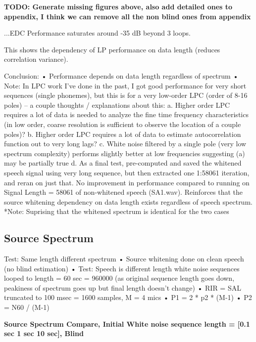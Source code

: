 \textbf{TODO: Generate missing figures above, also add detailed ones to appendix, I think we can remove all the non blind ones from appendix}


...EDC Performance saturates around -35 dB beyond 3 loops.


This shows the dependency of LP performance on data length (reduces correlation variance).

Conclusion:
•	Performance depends on data length regardless of spectrum
•	Note: In LPC work I’ve done in the past, I got good performance for very short sequences (single phonemes), but this is for a very low-order LPC (order of 8-16 poles) --  a couple thoughts / explanations about this:
a.	Higher order LPC requires a lot of data is needed to analyze the fine time frequency characteristics (in low order, coarse resolution is sufficient to observe the location of a couple poles)?
b.	Higher order LPC requires a lot of data to estimate autocorrelation function out to very long lags?
c.	White noise filtered by a single pole (very low spectrum complexity) performs slightly better at low frequencies suggesting  (a) may be partially true
d.	As a final test, pre-computed and saved the whitened speech signal using very long sequence, but then extracted one 1:58061 iteration, and reran on just that. No improvement in performance compared to running on Signal Length = 58061 of non-whitened speech (SA1.wav). Reinforces that the source whitening dependency on data length exists regardless of speech spectrum.
*Note: Suprising that the whitened spectrum is identical for the two cases


\subsection{Source Spectrum}

Test: Same length different spectrum
•	Source whitening done on clean speech (no blind estimation)
•	Test: Speech is different length white noise sequences looped to length = 60 sec = 960000 (as original sequence length goes down, peakiness of spectrum goes up but final length doesn’t change)
•	RIR = SAL truncated to 100 msec = 1600 samples, M = 4 mics
•	P1 = 2 * p2 * (M-1)
•	P2 = N60 / (M-1)

\textbf{Source Spectrum Compare, Initial White noise sequence length = [0.1 sec 1 sec  10 sec], Blind}

